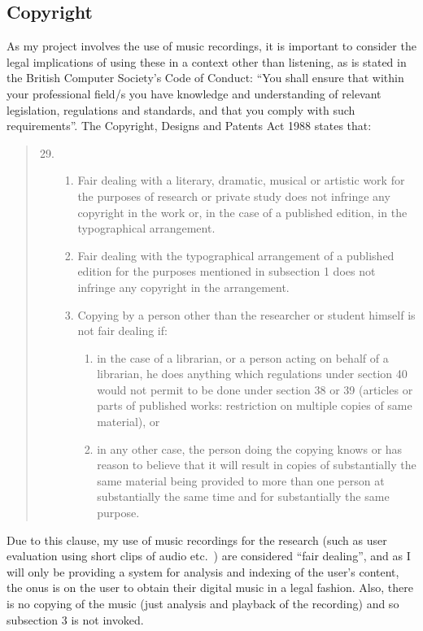 \subsection{Copyright}
As my project involves the use of music recordings, it is important to consider the legal implications of using these in a context other than listening, as is stated in the British Computer Society's Code of Conduct: ``You shall ensure that within your professional field/s you have knowledge and understanding of relevant legislation, regulations and standards, and that you comply with such requirements''. The Copyright, Designs and Patents Act 1988 states that:
\begin{quotation}
	\renewcommand{\labelenumi}{\arabic{enumi}}
	\renewcommand{\labelenumii}{(\arabic{enumii})}
	\renewcommand{\labelenumiii}{(\alph{enumiii})}
	\begin{enumerate}
	\setcounter{enumi}{28}
		\item \begin{enumerate}
			\item Fair dealing with a literary, dramatic, musical or artistic work for the purposes of research or private study does not infringe any copyright in the work or, in the case of a published edition, in the typographical arrangement.
			\item Fair dealing with the typographical arrangement of a published edition for the purposes mentioned in subsection 1 does not infringe any copyright in the arrangement.
			\item Copying by a person other than the researcher or student himself is not fair dealing if:
			\begin{enumerate}
				\item in the case of a librarian, or a person acting on behalf of a librarian, he does anything which regulations under section 40 would not permit to be done under section 38 or 39 (articles or parts of published works: restriction on multiple copies of same material), or
				\item in any other case, the person doing the copying knows or has reason to believe that it will result in copies of substantially the same material being provided to more than one person at substantially the same time and for substantially the same purpose.
			\end{enumerate}
		\end{enumerate}
	\end{enumerate}
\end{quotation}
Due to this clause, my use of music recordings for the research (such as user
evaluation using short clips of audio etc.\ ) are considered ``fair dealing'', and as I
will only be providing a system for analysis and indexing of the user's content,
the onus is on the user to obtain their digital music in a legal fashion. Also, there is no copying of the music (just analysis and playback of the recording)
and so subsection 3 is not invoked.

